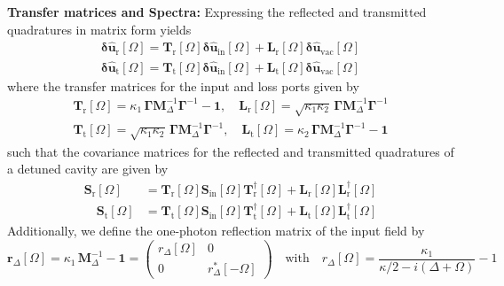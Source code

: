 \noindent \textbf{Transfer matrices and Spectra:} Expressing the reflected and transmitted quadratures in matrix form yields
\begin{equation}
  \begin{split}
   \mathbf{\delta \hat{u}_{\mathrm{r}}}[\Omega] = \mathbf{T}_{\mathrm{r}}[\Omega]  \mathbf{\delta \hat{u}_{\mathrm{in}}}[\Omega] + \mathbf{L}_{\mathrm{r}}[\Omega]  \mathbf{\delta \hat{u}_{\mathrm{vac}}}[\Omega]
    \\
    \mathbf{\delta \hat{u}_{\mathrm{t}}}[\Omega] = \mathbf{T}_{\mathrm{t}}[\Omega]  \mathbf{\delta \hat{u}_{\mathrm{in}}}[\Omega] + \mathbf{L}_{\mathrm{t}}[\Omega]  \mathbf{\delta \hat{u}_{\mathrm{vac}}}[\Omega]
  \end{split}
\end{equation}
where the transfer matrices for the input and loss ports given by
\begin{equation*}
  \begin{split}
     \mathbf{T}_{\mathrm{r}}[\Omega]= \kappa_1 \, \mathbf{\Gamma} \mathbf{M}^{-1}_\Delta \mathbf{\Gamma}^{-1}- \mathbf{1}, \quad \mathbf{L}_{\mathrm{r}}[\Omega]=  \sqrt{\kappa_1 \kappa_2} \, \mathbf{\Gamma}  \mathbf{M}^{-1}_\Delta \mathbf{\Gamma}^{-1}\\
      \mathbf{T}_{\mathrm{t}}[\Omega]=   \sqrt{\kappa_1 \kappa_2} \, \mathbf{\Gamma}  \mathbf{M}^{-1}_\Delta \mathbf{\Gamma}^{-1}, \quad \mathbf{L}_{\mathrm{t}}[\Omega]= \kappa_2 \, \mathbf{\Gamma} \mathbf{M}^{-1}_\Delta \mathbf{\Gamma}^{-1}- \mathbf{1}
  \end{split}
\end{equation*}
such that the covariance matrices for the reflected and transmitted quadratures of a detuned cavity are given by
\begin{equation}
  \begin{split}
  \mathbf{S}_{\mathrm{r}}[\Omega] &= \mathbf{T}_{\mathrm{r}}[\Omega] \mathbf{S}_{\mathrm{in}}[\Omega] \mathbf{T}_{\mathrm{r}}^{\dagger}[\Omega] + \mathbf{L}_{\mathrm{r}}[\Omega] \mathbf{L}_{\mathrm{r}}^{\dagger}[\Omega] \\ \quad  \mathbf{S}_{\mathrm{t}}[\Omega] &= \mathbf{T}_{\mathrm{t}}[\Omega] \mathbf{S}_{\mathrm{in}}[\Omega] \mathbf{T}_{\mathrm{t}}^{\dagger}[\Omega] + \mathbf{L}_{\mathrm{t}}[\Omega] \mathbf{L}_{\mathrm{t}}^{\dagger}[\Omega]
  \end{split}
\end{equation}
Additionally, we define the one-photon reflection matrix of the input field by 
\begin{equation}
  \mathbf{r}_{\Delta}[\Omega] = \kappa_1 \, \mathbf{M}^{-1}_\Delta- \mathbf{1} = \begin{pmatrix}
    r_{\Delta}[\Omega] & 0 \\
    0 & r_{\Delta}^*[-\Omega]
  \end{pmatrix} \quad \text{with} \quad r_{\Delta}[\Omega] = \frac{\kappa_1 }{\kappa/2 - i(\Delta + \Omega)} - 1
\end{equation}
